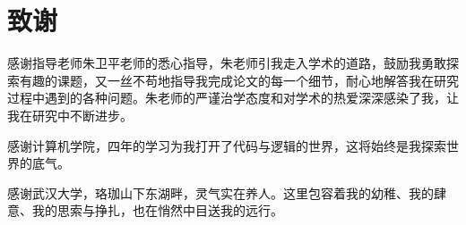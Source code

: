 
\clearpage
{}
{}

\chapter*{致谢}

感谢指导老师朱卫平老师的悉心指导，朱老师引我走入学术的道路，鼓励我勇敢探索有趣的课题，又一丝不苟地指导我完成论文的每一个细节，耐心地解答我在研究过程中遇到的各种问题。朱老师的严谨治学态度和对学术的热爱深深感染了我，让我在研究中不断进步。

感谢计算机学院，四年的学习为我打开了代码与逻辑的世界，这将始终是我探索世界的底气。

感谢武汉大学，珞珈山下东湖畔，灵气实在养人。这里包容着我的幼稚、我的肆意、我的思索与挣扎，也在悄然中目送我的远行。